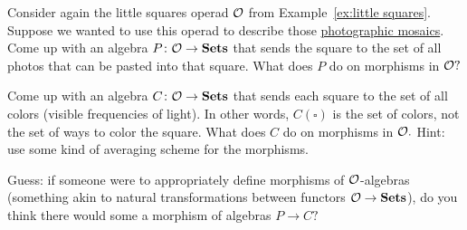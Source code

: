 \documentclass[CT4S-EN-RU]{subfiles}
\begin{document}
\begin{applicationRUS}
\end{applicationRUS}

\begin{exerciseENG}
Consider again the little squares operad $\mathcal{O}$ from Example~\ref{ex:little squares}. Suppose we wanted to use this operad to describe those \href{http://en.wikipedia.org/wiki/Photographic_mosaic}{\text photographic mosaics}. 
\sexc Come up with an algebra $P\colon\mathcal{O}\rightarrow{\mathbf{Sets}}$ that sends the square to the set of all photos that can be pasted into that square. What does $P$ do on morphisms in $\mathcal{O}?$
\item Come up with an algebra $C\colon\mathcal{O}\rightarrow{\mathbf{Sets}}$ that sends each square to the set of all colors (visible frequencies of light). In other words, $C(\square)$ is the set of colors, not the set of ways to color the square. What does $C$ do on morphisms in $\mathcal{O}.$ Hint: use some kind of averaging scheme for the morphisms.
\item Guess: if someone were to appropriately define morphisms of $\mathcal{O}$-algebras (something akin to natural transformations between functors $\mathcal{O}\rightarrow{\mathbf{Sets}}$), do you think there would some a morphism of algebras $P\to C?$
\endsexc
\end{exerciseENG}

\begin{exerciseRUS}
\end{exerciseRUS}


\subsubsection{}
\end{document}
